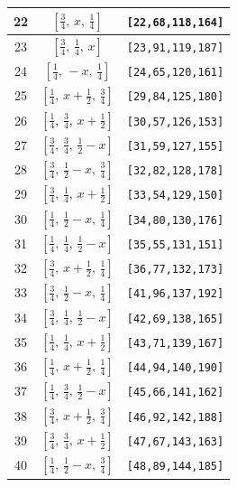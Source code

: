 \documentclass[fleqn,8pt]{jsarticle}
\begin{document}
\begin{longtable}{ccc}
22 & $\left[ \frac{3}{4},\, x,\, \frac{1}{4} \right]$ & {\tt [22,68,118,164]} \\ \hline
23 & $\left[ \frac{3}{4},\, \frac{1}{4},\, x \right]$ & {\tt [23,91,119,187]} \\ \hline
24 & $\left[ \frac{1}{4},\, - x,\, \frac{1}{4} \right]$ & {\tt [24,65,120,161]} \\ \hline
25 & $\left[ \frac{1}{4},\, x + \frac{1}{2},\, \frac{3}{4} \right]$ & {\tt [29,84,125,180]} \\ \hline
26 & $\left[ \frac{1}{4},\, \frac{3}{4},\, x + \frac{1}{2} \right]$ & {\tt [30,57,126,153]} \\ \hline
27 & $\left[ \frac{3}{4},\, \frac{3}{4},\, \frac{1}{2} - x \right]$ & {\tt [31,59,127,155]} \\ \hline
28 & $\left[ \frac{3}{4},\, \frac{1}{2} - x,\, \frac{3}{4} \right]$ & {\tt [32,82,128,178]} \\ \hline
29 & $\left[ \frac{3}{4},\, \frac{1}{4},\, x + \frac{1}{2} \right]$ & {\tt [33,54,129,150]} \\ \hline
30 & $\left[ \frac{1}{4},\, \frac{1}{2} - x,\, \frac{1}{4} \right]$ & {\tt [34,80,130,176]} \\ \hline
31 & $\left[ \frac{1}{4},\, \frac{1}{4},\, \frac{1}{2} - x \right]$ & {\tt [35,55,131,151]} \\ \hline
32 & $\left[ \frac{3}{4},\, x + \frac{1}{2},\, \frac{1}{4} \right]$ & {\tt [36,77,132,173]} \\ \hline
33 & $\left[ \frac{3}{4},\, \frac{1}{2} - x,\, \frac{1}{4} \right]$ & {\tt [41,96,137,192]} \\ \hline
34 & $\left[ \frac{3}{4},\, \frac{1}{4},\, \frac{1}{2} - x \right]$ & {\tt [42,69,138,165]} \\ \hline
35 & $\left[ \frac{1}{4},\, \frac{1}{4},\, x + \frac{1}{2} \right]$ & {\tt [43,71,139,167]} \\ \hline
36 & $\left[ \frac{1}{4},\, x + \frac{1}{2},\, \frac{1}{4} \right]$ & {\tt [44,94,140,190]} \\ \hline
37 & $\left[ \frac{1}{4},\, \frac{3}{4},\, \frac{1}{2} - x \right]$ & {\tt [45,66,141,162]} \\ \hline
38 & $\left[ \frac{3}{4},\, x + \frac{1}{2},\, \frac{3}{4} \right]$ & {\tt [46,92,142,188]} \\ \hline
39 & $\left[ \frac{3}{4},\, \frac{3}{4},\, x + \frac{1}{2} \right]$ & {\tt [47,67,143,163]} \\ \hline
40 & $\left[ \frac{1}{4},\, \frac{1}{2} - x,\, \frac{3}{4} \right]$ & {\tt [48,89,144,185]} \\ \hline

\end{longtable}
\end{document}
